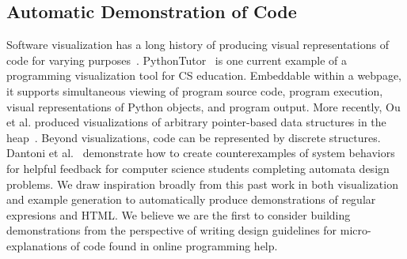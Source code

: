 \subsection{Automatic Demonstration of Code}

Software visualization has a long history of producing visual representations of code for varying purposes~\cite{sorva_visual_2012}.
PythonTutor~\cite{guo_online_2013} is one current example of a programming visualization tool for CS education.
Embeddable within a webpage, it supports simultaneous viewing of program source code, program execution, visual representations of Python objects, and program output.
More recently, Ou et al. produced visualizations of arbitrary pointer-based data structures in the heap~\cite{ou_interactive_2015}.
Beyond visualizations, code can be represented by discrete structures.
Dantoni et al.~\cite{dantoni_how_2015} demonstrate how to create counterexamples of system behaviors for helpful feedback for computer science students completing automata design problems.
We draw inspiration broadly from this past work in both visualization and example generation to automatically produce demonstrations of regular expresions and HTML.
We believe we are the first to consider building demonstrations from the perspective of writing design guidelines for micro-explanations of code found in online programming help.